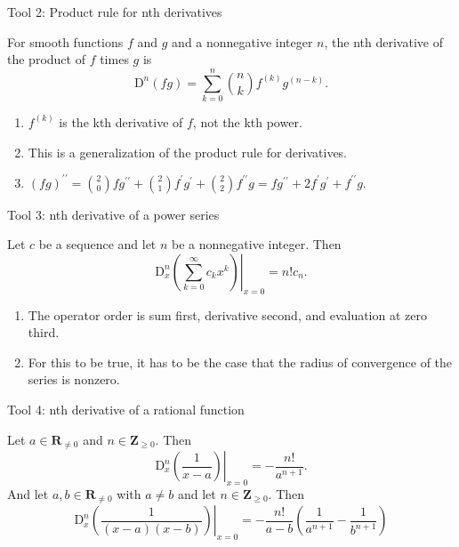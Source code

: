 \documentclass[portrait,fleqn,12pt]{beamer}
\newcommand{\reals}{\mathbf{R}}
\newcommand{\integers}{\mathbf{Z}}
\newcommand{\D}{\mathrm{D}}
\newenvironment{handlist}
   {\begin{enumerate}[\faHandPointRight]
       \addtolength{\itemsep}{0.0\itemsep}}
     {\end{enumerate}}
\begin{document}
\begin{frame}{Tool 2:  Product rule for nth derivatives}

For smooth functions $f$ and $g$ and a nonnegative integer $n$, the nth derivative of the product of $f$ times $g$ is
\begin{equation}
       \D^n (f g) = \sum_{k=0}^n  \binom{n}{k}  f^{(k)} g^{(n-k)}.
\end{equation}
\begin{handlist}
\item $ f^{(k)}$ is the kth derivative of $f$, not the kth power.
\item This is a generalization of the product rule for derivatives.
\item $(f g)^{\prime \prime} = \binom{2}{0} f g^{\prime \prime} + \binom{2}{1} f^\prime  g^{\prime} +
\binom{2}{2} f^{\prime \prime} g  = f g^{\prime \prime} + 2  f^\prime  g^{\prime} + f^{\prime \prime} g$.
\end{handlist}
\end{frame}


\begin{frame}{Tool 3:  nth derivative of a power series}

Let $c$ be a sequence and let $n$ be a nonnegative integer.  Then
\begin{equation}
      \left.  \D^n_x \left( \sum_{k=0}^\infty c_k x^k  \right)  \right \vert_{x=0} = n!  c_n.
\end{equation}
\begin{handlist}
 \item The operator order is sum first, derivative second, and  evaluation at zero third.
   \item For this to be true, it has to be the case that  the radius of convergence of the series is nonzero.
\end{handlist}
\end{frame}

\begin{frame}{Tool 4:   nth derivative of a rational function}

Let $a \in \reals_{\neq 0} $ and $n \in \integers_{\geq 0}$. Then
\begin{equation*}
      \left.  \D^n_x \left(\frac{1}{x-a}  \right) \right \vert_{x=0} = -\frac{n!}{a^{n+1}}.
\end{equation*}
And let $a,b \in \reals_{\neq 0} $ with $a \neq b$  and let $n \in \integers_{\geq 0}$. Then
\begin{equation*}
      \left.  \D^n_x \left(\frac{1}{(x-a)(x-b)}  \right) \right \vert_{x=0} = -\frac{n!}{a-b} \left(\frac{1}{a^{n+1}} - \frac{1}{b^{n+1}} \right)
\end{equation*}
\end{frame}
\end{document}
